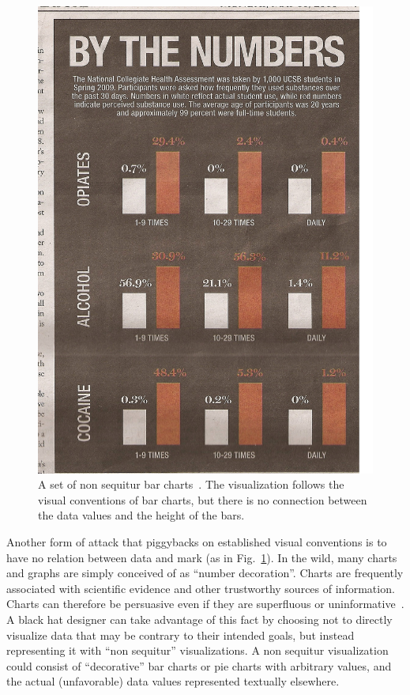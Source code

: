 \documentclass{vgtc}                          %
\begin{document}
\begin{figure}
	\centering
	\includegraphics[width=.8\columnwidth]{pictures/badbars.jpg}
	\caption{A set of non sequitur bar charts~\cite{eagereyes}. The visualization follows the visual conventions of bar charts, but there is no connection between the data values and the height of the bars.}
	\label{fig:nonseq}
\end{figure}

Another form of attack that piggybacks on established visual conventions is to have no relation between data and mark (as in Fig.~\ref{fig:nonseq}). In the wild, many charts and graphs are simply conceived of as ``number decoration''\cite{moritz2017}. Charts are frequently associated with scientific evidence and other trustworthy sources of information. Charts can therefore be persuasive even if they are superfluous or uninformative~\cite{tal2016blinded}. A black hat designer can take advantage of this fact by choosing not to directly visualize data that may be contrary to their intended goals, but instead representing it with ``non sequitur'' visualizations. A non sequitur visualization could consist of ``decorative'' bar charts or pie charts with arbitrary values, and the actual (unfavorable) data values represented textually elsewhere.
\end{document}
